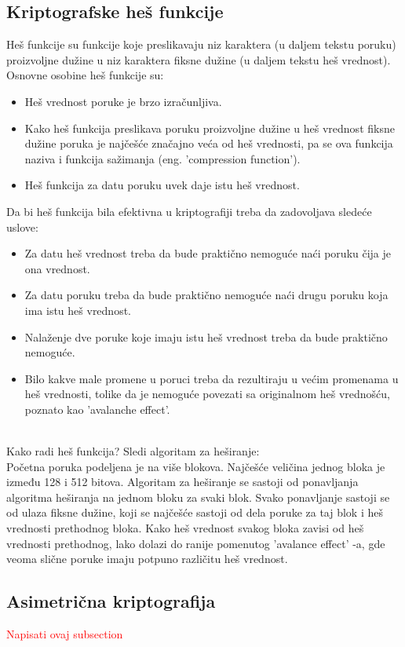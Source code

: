 \documentclass[a4paper]{article}
\newcommand\todo[1]{\textcolor{red}{#1}}
\begin{document}
{\subsection{Kriptografske heš funkcije}
Heš funkcije su funkcije koje preslikavaju niz karaktera (u daljem tekstu poruku) proizvoljne dužine u niz karaktera fiksne dužine (u daljem tekstu heš vrednost). Osnovne osobine heš funkcije su:
\begin{itemize}
\item Heš vrednost poruke je brzo izračunljiva.
\item Kako heš funkcija preslikava poruku proizvoljne dužine u heš vrednost fiksne dužine poruka je najčešće značajno veća od heš vrednosti, pa se ova funkcija naziva i funkcija sažimanja (eng. 'compression function').
\item Heš funkcija za datu poruku uvek daje istu heš vrednost.
\end{itemize}
Da bi heš funkcija bila efektivna u kriptografiji treba da zadovoljava sledeće uslove:
\begin{itemize}
\item Za datu heš vrednost treba da bude praktično nemoguće naći poruku čija je ona vrednost.
\item Za datu poruku treba da bude praktično nemoguće naći drugu poruku koja ima istu heš vrednost.
\item Nalaženje dve poruke koje imaju istu heš vrednost treba da bude praktično nemoguće. 
\item Bilo kakve male promene u poruci treba da rezultiraju u većim promenama u heš vrednosti, tolike da je nemoguće povezati sa originalnom heš vrednošću, poznato kao 'avalanche effect'.
\end{itemize}
\\ Kako radi heš funkcija? Sledi algoritam za heširanje:\\
Početna poruka podeljena je na više blokova. Najčešće veličina jednog bloka je između 128 i 512 bitova. Algoritam za heširanje se sastoji od ponavljanja algoritma heširanja na jednom bloku za svaki blok. Svako ponavljanje sastoji se od ulaza fiksne dužine, koji se najčešće sastoji od dela poruke za taj blok i heš vrednosti prethodnog bloka. Kako heš vrednost svakog bloka zavisi od heš vrednosti prethodnog, lako dolazi do ranije pomenutog 'avalance effect' -a, gde veoma slične poruke imaju potpuno različitu heš vrednost.

\subsection{Asimetrična kriptografija}
\todo{Napisati ovaj subsection}

}
\end{document}
